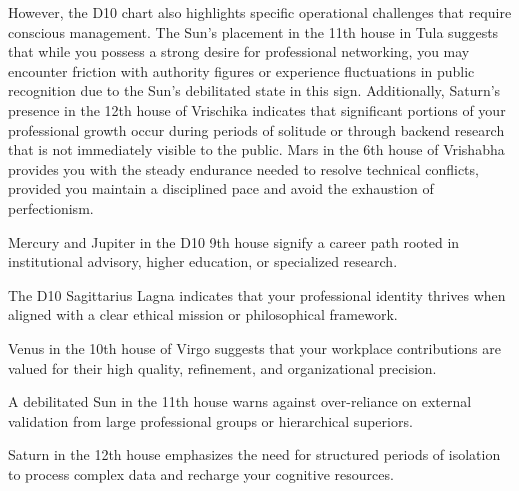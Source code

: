 {\fontsize{9}{13}\selectfont However, the D10 chart also highlights specific operational challenges that require conscious management. The Sun's placement in the 11th house in Tula suggests that while you possess a strong desire for professional networking, you may encounter friction with authority figures or experience fluctuations in public recognition due to the Sun's debilitated state in this sign. Additionally, Saturn's presence in the 12th house of Vrischika indicates that significant portions of your professional growth occur during periods of solitude or through backend research that is not immediately visible to the public. Mars in the 6th house of Vrishabha provides you with the steady endurance needed to resolve technical conflicts, provided you maintain a disciplined pace and avoid the exhaustion of perfectionism.}\par\vspace{1.8mm}

\begin{diamondlist}
  \item {\fontsize{8.5}{12}\selectfont Mercury and Jupiter in the D10 9th house signify a career path rooted in institutional advisory, higher education, or specialized research.}
  \item {\fontsize{8.5}{12}\selectfont The D10 Sagittarius Lagna indicates that your professional identity thrives when aligned with a clear ethical mission or philosophical framework.}
  \item {\fontsize{8.5}{12}\selectfont Venus in the 10th house of Virgo suggests that your workplace contributions are valued for their high quality, refinement, and organizational precision.}
  \item {\fontsize{8.5}{12}\selectfont A debilitated Sun in the 11th house warns against over-reliance on external validation from large professional groups or hierarchical superiors.}
  \item {\fontsize{8.5}{12}\selectfont Saturn in the 12th house emphasizes the need for structured periods of isolation to process complex data and recharge your cognitive resources.}
\end{diamondlist}



